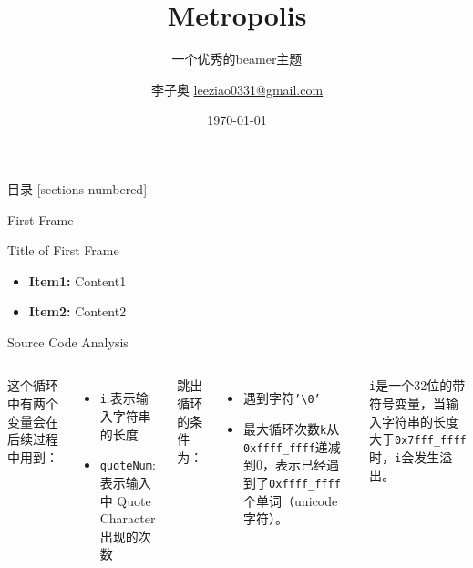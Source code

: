 \documentclass[8pt,UTF8]{ctexbeamer}
\title{Metropolis} %
\subtitle{一个优秀的beamer主题} %
\date{\today} %
\author{李子奥 \hspace{2em} \href{mailto: leeziao0331@gmail.com}{leeziao0331@gmail.com}} %
\institute{华中科技大学 \hspace{4em} 人工智能与自动化学院} %
\newcommand{\iitem}[2]{\item \textbf{#1:} #2}
\newcommand{\headline}[1]{\centerline{\Large #1}}
\begin{document}
\maketitle %

\begin{frame}{目录}
  [sections numbered]
  \tableofcontents%
\end{frame}

\begin{frame}{First Frame}
	\headline{Title of First Frame}
	\begin{itemize}
		\iitem{Item1}{Content1}
		\iitem{Item2}{Content2}
	\end{itemize}
\end{frame}

\begin{frame}[fragile]{Source Code Analysis}
  \begin{columns}[T,onlytextwidth]
	\changefontsize[8pt]{8pt}
	
	\changefontsize[6pt]{6pt}
	\noindent 这个循环中有两个变量会在后续过程中用到：
	\begin{itemize}
		\item \texttt{i}:表示输入字符串的长度
		\item \texttt{quoteNum}:表示输入中 \small{Quote Character} 出现的次数
	\end{itemize}
	跳出循环的条件为：
	\begin{itemize}
		\item 遇到字符\texttt{'\textbackslash 0'}
		\item 最大循环次数\texttt{k}从\texttt{0xffff\_ffff}递减到0，表示已经遇到了\texttt{0xffff\_ffff}个单词（unicode字符）。
	\end{itemize}
	\pause
	\texttt{i}是一个32位的带符号变量，当输入字符串的长度大于\texttt{0x7fff\_ffff}时，\texttt{i}会发生溢出。
  \end{columns}
\end{frame}
\end{document}
